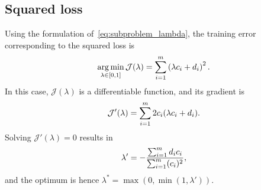\subsection{Squared loss}
Using the formulation of~\eqref{eq:subproblem_lambda}, the training error corresponding to the squared loss is
\begin{equation}
    \label{eq:opt_sq}
    \argmin_{\lambda \in [0, 1]} \mathcal{J}(\lambda) = \sum_{i=1}^{\npertask} \left({\lambda c_i + d_i}\right)^2 .
\end{equation}
In this case, $\mathcal{J}(\lambda)$ is a differentiable function, and its gradient is 
\begin{equation}
    \nonumber
    \mathcal{J}'(\lambda) = \sum_{i=1}^m 2 c_i (\lambda c_i + d_i) .
\end{equation}
Solving $\mathcal{J}'(\lambda)= 0$ results in
%
\begin{equation*}
\lambda' =  -\frac{\sum_{i=1}^{m} d_i c_i }{\sum_{i=1}^{m} (c_i)^2 } ,
\end{equation*}
and the optimum is hence $\lambda^* = \max(0, \min(1, \lambda'))$.

